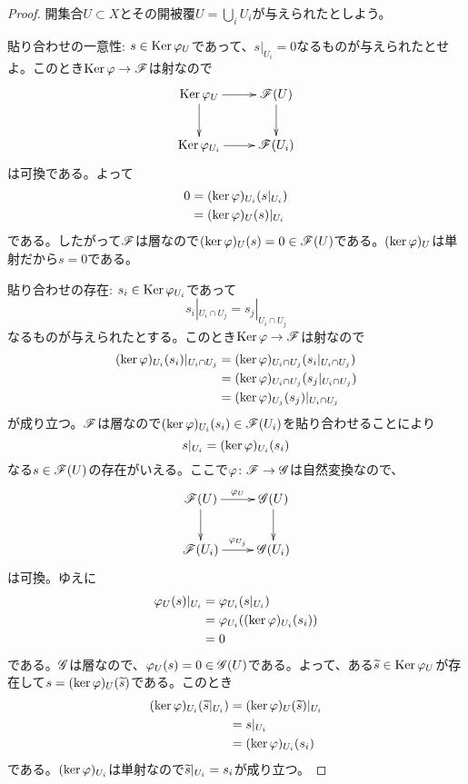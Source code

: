 \begin{proof}
開集合$U \subset X$とその開被覆$U = \bigcup_i U_i$が与えられたとしよう。

貼り合わせの一意性: $s \in \operatorname{Ker} {\varphi}_U$であって、$s|_{U_i}=0$なるものが与えられたとせよ。このとき$\operatorname{Ker} {\varphi} \to \mathscr{F}$は射なので
\[
\xymatrix{
\Ker \vp_U \ar[r] \ar[d] & \scrf(U) \ar[d] \\
\Ker \vp_{U_i} \ar[r] & \scrf(U_i)
}
\]
は可換である。よって
\begin{align*}
  0 &= (\ker {\varphi})_{U_i} (s|_{U_i}) \\
  &= (\ker {\varphi})_U (s)|_{U_i}
\end{align*}
である。したがって$\mathscr{F}$は層なので$(\ker {\varphi})_U (s) = 0 \in \mathscr{F}(U)$である。$(\ker {\varphi})_U$は単射だから$s=0$である。

貼り合わせの存在: $s_i \in \operatorname{Ker} {\varphi}_{U_i}$であって
\[
s_i|_{U_i \cap U_j} = s_j|_{U_i \cap U_j}
\]
なるものが与えられたとする。このとき$\operatorname{Ker} {\varphi} \to \mathscr{F}$は射なので
\begin{align*}
  (\ker {\varphi})_{U_i} (s_i)|_{U_i \cap U_j} &= (\ker {\varphi})_{U_i \cap U_j} (s_i |_{U_i \cap U_j}) \\
  &= (\ker {\varphi})_{U_i \cap U_j} (s_j |_{U_i \cap U_j}) \\
  &= (\ker {\varphi})_{U_j} (s_j)|_{U_i \cap U_j}
\end{align*}
が成り立つ。$\mathscr{F}$は層なので$(\ker {\varphi})_{U_i}(s_i) \in \mathscr{F}(U_i)$を貼り合わせることにより
\[
s|_{U_i} = (\ker {\varphi})_{U_i}(s_i)
\]
なる$s \in \mathscr{F}(U)$の存在がいえる。ここで${\varphi} \colon \mathscr{F} \to \mathscr{G}$は自然変換なので、
\[
\xymatrix{
\scrf(U) \ar[r]^-{\vp_U} \ar[d] & \scrg(U) \ar[d] \\
\scrf(U_i) \ar[r]^-{\vp_{U_j}} & \scrg(U_i)
}
\]
は可換。ゆえに
\begin{align*}
  {\varphi}_U(s)|_{U_i} &= {\varphi}_{U_i} (s|_{U_i}) \\
  &= {\varphi}_{U_i} ( (\ker {\varphi})_{U_i} (s_i) ) \\
  &= 0
\end{align*}
である。$\mathscr{G}$は層なので、${\varphi}_U(s) = 0 \in \mathscr{G}(U)$である。よって、ある$\widetilde{s} \in \operatorname{Ker} {\varphi}_U$が存在して$s = (\ker {\varphi})_U (\widetilde{s})$である。このとき
\begin{align*}
  (\ker {\varphi})_{U_i} (\widetilde{s}|_{U_i}) &= (\ker {\varphi})_U (\widetilde{s}) |_{U_i} \\
  &= s|_{U_i} \\
  &= (\ker {\varphi})_{U_i} (s_i)
\end{align*}
である。$(\ker {\varphi})_{U_i}$は単射なので$\widetilde{s}|_{U_i} = s_i$が成り立つ。
\end{proof}





